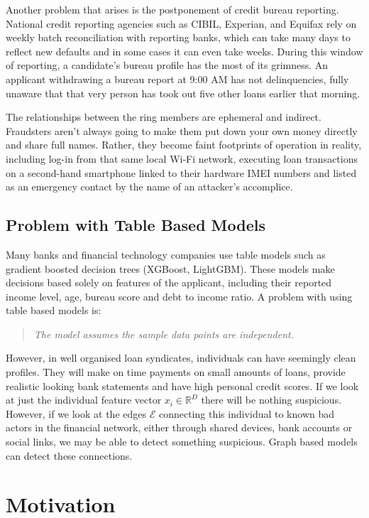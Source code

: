 Another problem that arises is the postponement of credit bureau reporting. National credit reporting agencies such as CIBIL, Experian, and Equifax rely on weekly batch reconciliation with reporting banks, which can take many days to reflect new defaults and in some cases it can even take weeks. During this window of reporting, a candidate’s bureau profile has the most of its grimness. An applicant withdrawing a bureau report at 9:00 AM has not delinquencies, fully unaware that that very person has took out five other loans earlier that morning. 

The relationships between the ring members are ephemeral and indirect. Fraudsters aren’t always going to make them put down your own money directly and share full names. Rather, they become faint footprints of operation in reality, including log-in from that same local Wi-Fi network, executing loan transactions on a second-hand smartphone linked to their hardware IMEI numbers and listed as an emergency contact by the name of an attacker’s accomplice.

\subsection{Problem with Table Based Models}
\label{sec:conventional_limitations}

Many banks and financial technology companies use table models such as gradient boosted decision trees (XGBoost, LightGBM). These models make decisions based solely on features of the applicant, including their reported income level, age, bureau score and debt to income ratio. A problem with using table based models is:
\begin{quote}
    \textit{The model assumes the sample data points are independent.}
\end{quote}
However, in well organised loan syndicates, individuals can have seemingly clean profiles. They will make on time payments on small amounts of loans, provide realistic looking bank statements and have high personal credit scores. If we look at just the individual feature vector $x_i \in \mathbb{R}^D$ there will be nothing suspicious. However, if we look at the edges $\mathcal{E}$ connecting this individual to known bad actors in the financial network, either through shared devices, bank accounts or social links, we may be able to detect something suspicious. Graph based models can detect these connections.

\section[Motivation]{\textbf{Motivation}}
\label{sec:motivation}

